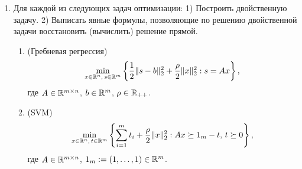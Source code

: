 \documentclass{article}
\begin{document}
\begin{enumerate}[label=\textbf{\arabic*}, leftmargin=0em]
\begin{enumerate}
\end{enumerate}
\item Для каждой из следующих задач оптимизации: 1) Построить двойственную задачу. 2) Выписать явные формулы, позволяющие по решению двойственной задачи восстановить (вычислить) решение прямой.
\begin{enumerate}
\item (Гребневая регрессия)
\begin{equation}
\min_{x \in \mathbb{R}^n, \, s \in \mathbb{R}^m} \left\{ \frac{1}{2} \| s - b \|_2^2 + \frac{\rho}{2} \| x \|_2^2 : s = Ax \right\},
\end{equation}
где $A \in \mathbb{R}^{m \times n}$, $b \in \mathbb{R}^m$, $\rho \in \mathbb{R}_{++}$.
\item (SVM)
\begin{equation}
\min_{x \in \mathbb{R}^n, \, t \in \mathbb{R}^m} \left\{ \sum_{i=1}^m t_i + \frac{\rho}{2} \| x \|_2^2 : A x \succeq 1_m - t, \, t \succeq 0 \right\},
\end{equation}
где $A \in \mathbb{R}^{m \times n}$, $1_m := (1, \dots, 1) \in \mathbb{R}^m$.
\end{enumerate}


\end{enumerate}
\end{document}
